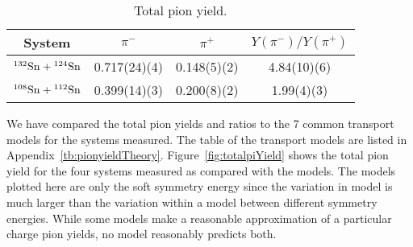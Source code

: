 

\begin{table*}\centering
{}
\begin{tabular}{@{}cccc@{}}\toprule
System & $\pi^-$ & $\pi^+$ & $Y(\pi^-)/Y(\pi^+)$  \\
\midrule
${}^{132}\mathrm{Sn} + {}^{124}\mathrm{Sn}$ & 0.717(24)(4) & 0.148(5)(2) & 4.84(10)(6)  \\
${}^{108}\mathrm{Sn} + {}^{112}\mathrm{Sn}$ & 0.399(14)(3) & 0.200(8)(2) & 1.99(4)(3)  \\
\bottomrule
\end{tabular}
\caption{Total pion yield.}
\label{tb:pionyield}
\end{table*}


We have compared the total pion yields and ratios to the 7 common transport models for the systems measured. The table of the transport models are listed in Appendix~\ref{tb:pionyieldTheory}. Figure~\ref{fig:totalpiYield} shows the total pion yield for the four systems measured as compared with the models. The models plotted here are only the soft symmetry energy since the variation in model is much larger than the variation within a model between different symmetry energies. While some models make a reasonable approximation of a particular charge pion yields, no model reasonably predicts both. 

